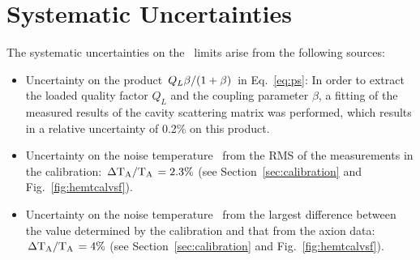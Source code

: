 \section{Systematic Uncertainties} \label{sec:sys}
The systematic uncertainties on the \gagg\ limits arise from the 
following sources:
\begin{itemize}
\item Uncertainty on the product 
$\left.Q_L\beta\middle/\left(1+\beta\right)\right.$ in Eq.~\eqref{eq:ps}: 
In order to extract the loaded quality factor $Q_L$ and the coupling parameter 
$\beta$, a fitting of the measured results of the cavity scattering matrix 
was performed, which results in a relative uncertainty of 0.2\% on this 
product. 

\item Uncertainty on the noise temperature \ta\ from the RMS of 
the measurements in the calibration: 
$\left. \Delta \text{T}_\text{A}\middle/\text{T}_\text{A}\right.= 2.3\%$ 
(see Section~\ref{sec:calibration} and Fig.~\ref{fig:hemtcalvsf}).

\item Uncertainty on the noise temperature \ta\ from the largest difference 
between the value determined by the calibration and that from the axion 
data: $\left. \Delta \text{T}_\text{A}\middle/\text{T}_\text{A}\right.= 4\%$ 
(see Section~\ref{sec:calibration} and Fig.~\ref{fig:hemtcalvsf}). 


\end{itemize}
